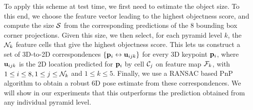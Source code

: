 

To apply this scheme at test time, we first need to estimate the object size. To this end, we choose the feature vector leading to the highest objectness score, and compute the size ${\cal S}$ from the corresponding predictions of the 8 bounding box corner projections. Given this size, we then select, for each pyramid level $k$, the ${\cal N}_k$  feature cells that give the highest objectness score. This lets us construct a set of 3D-to-2D correspondences $\{{\bf p}_i \leftrightarrow {\bf u}_{ijk}\}$ for every 3D keypoint ${\bf p}_i$, where ${\bf u}_{ijk}$ is the 2D location predicted for ${\bf p}_i$ by cell ${\cal C}_j$ on feature map ${\cal F}_k$, with $1\le i \le 8, 1\le j \le {\cal N}_k $ and $1\le k \le 5$. Finally, we use a RANSAC based PnP algorithm to obtain a robust 6D pose estimate from these correspondences. We will show in our experiments that this outperforms the prediction obtained from any individual pyramid level.

% 
